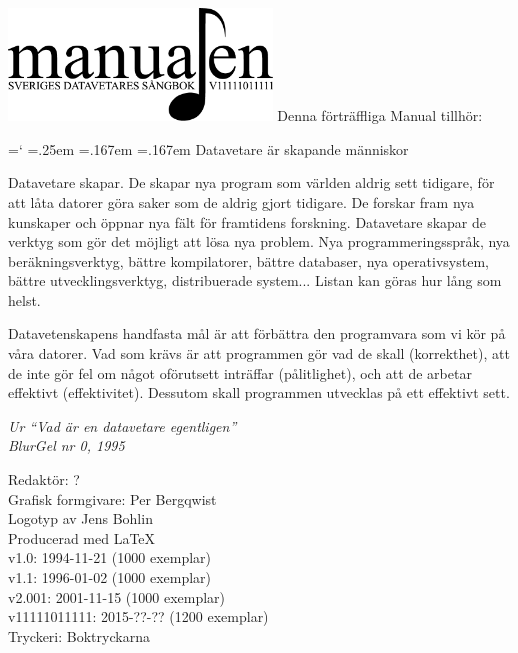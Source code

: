 \documentclass[a6paper,fontsize=10pt,twoside,open=right]{scrbook}
\DeclareRobustCommand*{\ttfamily}{%
  \origttfamily
  \hyphenchar\font=`\-\relax
  \fontdimen3\font=.25em\relax
  \fontdimen4\font=.167em\relax
  \fontdimen7\font=.167em\relax
}
\begin{document}
\setlength{\parindent}{0pt}
\vspace*{6.5cm}
\hspace*{0.9cm}
\includegraphics[keepaspectratio,width=7cm]{elements/logo.pdf}
\clearpage
\noindent Denna förträffliga Manual tillhör:
\ohead{\textnormal{\textsc{\scriptsize\leftmark}}}
\ofoot[\pagemark]{\textsc{\scriptsize\pagemark}}
\clearpage
{\ttfamily Datavetare är skapande människor\par
  \vspace{10pt} Datavetare skapar. De skapar nya program som världen
  aldrig sett tidigare, för att låta datorer göra saker som de aldrig
  gjort tidigare. De forskar fram nya kunskaper och öppnar nya fält
  för framtidens forskning. Datavetare skapar de verktyg som gör det
  möjligt att lösa nya problem. Nya programmeringsspråk, nya
  beräkningsverktyg, bättre kompilatorer, bättre databaser, nya
  operativsystem, bättre utvecklingsverktyg, distribuerade
  system... Listan kan göras hur lång som helst.\par
  \vspace{10pt} Datavetenskapens handfasta mål är att förbättra den
  programvara som vi kör på våra datorer. Vad som krävs är att
  programmen gör vad de skall (korrekthet), att de inte gör fel om
  något oförutsett inträffar (pålitlighet), och att de arbetar
  effektivt (effektivitet). Dessutom skall programmen utvecklas på ett
  effektivt sett.}\par
\vspace{10pt}
{\footnotesize\textit{Ur ``Vad är en datavetare
egentligen''\\ BlurGel nr 0, 1995}}
\clearpage
\setlength{\parindent}{15pt}
\null
\vfill
    {\noindent\small\centering
      Redaktör: ?\\
      Grafisk formgivare: Per Bergqwist\\
      Logotyp av Jens Bohlin\\
      Producerad med \LaTeX\\
      v1.0: 1994-11-21 (1000 exemplar)\\
      v1.1: 1996-01-02 (1000 exemplar)\\
      v2.001: 2001-11-15 (1000 exemplar)\\
      v11111011111: 2015-??-?? (1200 exemplar)\\
      Tryckeri: Boktryckarna\par
    }
\cleardoublepage
\end{document}
